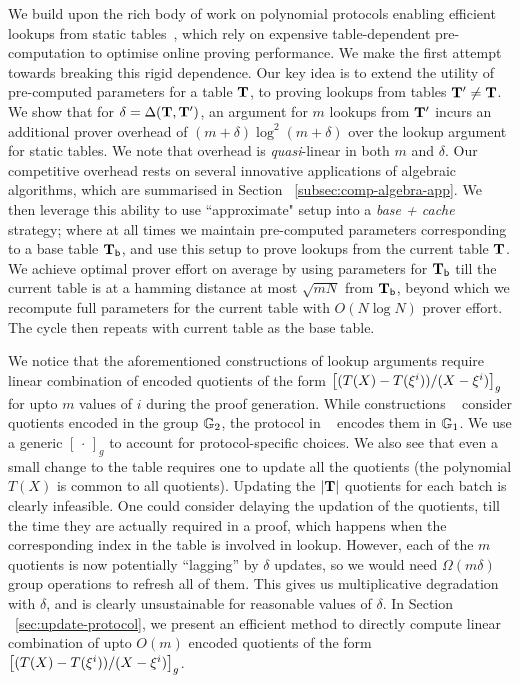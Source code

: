 \smallskip

 We build upon the rich body of work on polynomial protocols enabling efficient lookups from static tables~\cite{CCS:ZBKMNS22,EPRINT:PosKat22,EPRINT:ZGKMR22,EPRINT:EagFioGab22}, which rely on expensive table-dependent pre-computation
to optimise online proving performance. We make the first attempt towards breaking this rigid dependence.
Our key idea is to extend the utility of pre-computed
parameters for a table $\mathbf{T}$, to proving lookups from tables $\mathbf{T}'\neq \mathbf{T}$.
We show that for $\delta=\Delta(\mathbf{T}, \mathbf{T}')$,
an argument for $m$ lookups from $\mathbf{T}'$ incurs an additional prover overhead of $(m+\delta)\log^2(m+\delta)$ over the
lookup argument for static tables. We note that overhead is {\em quasi}-linear in both $m$ and $\delta$.
Our competitive overhead rests on several innovative applications of algebraic
algorithms, which are summarised in Section ~\ref{subsec:comp-algebra-app}. We then leverage this ability to use ``approximate"
setup into a {\em base + cache} strategy; where at all times we maintain pre-computed parameters corresponding to
a base table $\mathbf{T}_{\mathsf{b}}$, and use this setup to prove lookups from the current table $\mathbf{T}$. We achieve optimal
prover effort on average by using parameters for $\mathbf{T}_{\mathsf{b}}$ till the current table is at a hamming distance
at most $\sqrt{mN}$ from $\mathbf{T}_{\mathsf{b}}$, beyond which we recompute full parameters for the current table with
$O(N\log N)$ prover effort. The cycle then repeats with current table as the base table.

\smallskip

 We notice that the aforementioned constructions of lookup arguments require linear combination of
encoded quotients of the form $\left[{(T(X)-T(\xi^i))/(X-\xi^i)}\right]_g$ for upto $m$ values of $i$ during the proof generation.
While constructions ~\cite{CCS:ZBKMNS22,EPRINT:PosKat22}
consider quotients encoded in the group $\mathbb{G}_2$, the protocol in ~\cite{EPRINT:EagFioGab22} encodes them in $\mathbb{G}_1$.
We use a generic $[\,\cdot\,]_g$ to
account for protocol-specific choices. We also see that even a small change to the table requires one to update all the quotients (the polynomial $T(X)$ is
common to all quotients). Updating the $|\mathbf{T}|$ quotients for each batch is clearly infeasible. One could consider delaying the updation of the quotients, till
the time they are actually required in a proof, which happens when the corresponding index in the table is involved in lookup. However, each of the $m$ quotients
is now potentially ``lagging'' by $\delta$ updates, so we would need $\Omega(m\delta)$ group operations to refresh all of them. This gives us multiplicative degradation
with $\delta$, and is clearly unsustainable for reasonable values of $\delta$. In Section ~\ref{sec:update-protocol}, we present an efficient method
to directly compute linear combination of upto $O(m)$ encoded quotients of the form $\left[{(T(X)-T(\xi^i))/(X-\xi^i)}\right]_g$.

